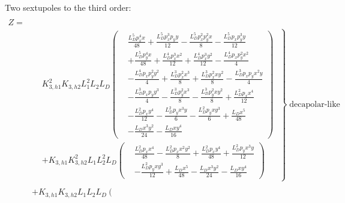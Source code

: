 Two sextupoles to the third order:
\footnotesize
\begin{equation}
  \begin{aligned}
    \\[7em]
    Z =
      \\[-9.7em]
      &\left.
      \begin{aligned}
      &K_{3,h1}^{2} K_{3,h2} L_{1}^{2} L_{2} L_{D} \left(
     \begin{aligned}
       &\frac{L_{D}^{5} p_{x}^{4} x}{48} + \frac{L_{D}^{5} p_{x}^{3} p_{y} y}{12} - \frac{L_{D}^{5} p_{x}^{2} p_{y}^{2} x}{8} - \frac{L_{D}^{5} p_{x} p_{y}^{3} y}{12} \\
       &+ \frac{L_{D}^{5} p_{y}^{4} x}{48} + \frac{L_{D}^{4} p_{x}^{3} x^{2}}{12} + \frac{L_{D}^{4} p_{x}^{3} y^{2}}{12}- \frac{L_{D}^{4} p_{x} p_{y}^{2} x^{2}}{4} \\
       &- \frac{L_{D}^{4} p_{x} p_{y}^{2} y^{2}}{4} + \frac{L_{D}^{3} p_{x}^{2} x^{3}}{8} + \frac{L_{D}^{3} p_{x}^{2} x y^{2}}{8} - \frac{L_{D}^{3} p_{x} p_{y} x^{2} y}{4} \\
       &- \frac{L_{D}^{3} p_{x} p_{y} y^{3}}{4} - \frac{L_{D}^{3} p_{y}^{2} x^{3}}{8} - \frac{L_{D}^{3} p_{y}^{2} x y^{2}}{8} + \frac{L_{D}^{2} p_{x} x^{4}}{12} \\
       &- \frac{L_{D}^{2} p_{x} y^{4}}{12} - \frac{L_{D}^{2} p_{y} x^{3} y}{6} - \frac{L_{D}^{2} p_{y} x y^{3}}{6} + \frac{L_{D} x^{5}}{48} \\
       &- \frac{L_{D} x^{3} y^{2}}{24} - \frac{L_{D} x y^{4}}{16}
     \end{aligned} \right) \\
      &+ K_{3,h1} K_{3,h2}^{2} L_{1} L_{2}^{2} L_{D} \left(
      \begin{aligned}
        &\frac{L_{D}^{2} p_{x} x^{4}}{48} - \frac{L_{D}^{2} p_{x} x^{2} y^{2}}{8} + \frac{L_{D}^{2} p_{x} y^{4}}{48} + \frac{L_{D}^{2} p_{y} x^{3} y}{12} \\
        &- \frac{L_{D}^{2} p_{y} x y^{3}}{12} + \frac{L_{D} x^{5}}{48} - \frac{L_{D} x^{3} y^{2}}{24} - \frac{L_{D} x y^{4}}{16}
      \end{aligned}\right)
      \end{aligned}
      \; \right\} \; \text{decapolar-like} \\
      \\[-1.5em]
    &+ K_{3,h1} K_{3,h2} L_{1} L_{2} L_{D} \left. \left(
    \begin{aligned}

\end{aligned}
\end{aligned}
\end{equation}
